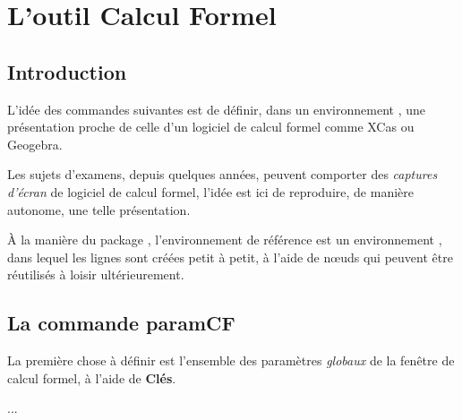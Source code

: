 \documentclass{article}
\newcommand\ctex[1]{\tcbox[vignettelatex]{#1}}
\newcommand\Cle[1]{{\bfseries\sffamily\textlangle #1\textrangle}}
\begin{document}
\newpage

\section{L'outil \og Calcul Formel \fg}

\subsection{Introduction}

\begin{codeidee}
L'idée des commandes suivantes est de définir, dans un environnement \TikZ, une présentation proche de celle d'un logiciel de calcul formel comme \textsf{XCas} ou \textsf{Geogebra}.

\smallskip

Les sujets d'examens, depuis quelques années, peuvent comporter des \textit{captures d'écran} de logiciel de calcul formel, l'idée est ici de reproduire, de manière autonome, une telle présentation.

\smallskip

À la manière du {package} \ctex{tkz-tab}, l'environnement de référence est un environnement \TikZ, dans lequel les lignes sont créées petit à petit, à l'aide de nœuds qui peuvent être réutilisés à loisir ultérieurement.
\end{codeidee}

\subsection{La commande \og paramCF \fg}

\begin{codeinfo}
La première chose à définir est l'ensemble des paramètres \textit{globaux} de la fenêtre de calcul formel, à l'aide de \Cle{Clés}.
\end{codeinfo}

\begin{codetex}
...
\end{codetex}
\end{document}
